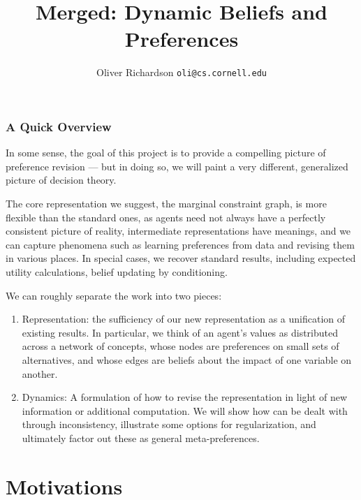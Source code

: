 \documentclass{article}
\title{Merged: Dynamic Beliefs and Preferences}
\author{Oliver Richardson  \texttt{oli@cs.cornell.edu}}
\begin{document}
	\maketitle
	

	\section*{A Quick Overview}
	In some sense, the goal of this project is to provide a compelling picture of preference revision --- but in doing so, we will paint a very different, generalized picture of decision theory. 
	
	The core representation we suggest, the marginal constraint graph, is more flexible than the standard ones, as agents need not always have a perfectly consistent picture of reality, intermediate representations have meanings, and we can capture phenomena such as learning preferences from data and revising them in various places. In special cases, we recover standard results, including expected utility calculations, belief updating by conditioning.
	
	We can roughly separate the work into two pieces:
	\begin{enumerate}%
		\item Representation: the sufficiency of our new representation as a unification of existing results. In particular, we think of an agent's values as distributed across a network of concepts, whose nodes are preferences on small sets of alternatives, and whose edges are beliefs about the impact of one variable on another.
		\item Dynamics: A formulation of how to revise the representation in light of new information or additional computation. We will show how can be dealt with through inconsistency, illustrate some options for regularization, and ultimately factor out these as general meta-preferences. 
	\end{enumerate}

	\tableofcontents
	\clearpage
	\part{Motivations}
\end{document}
